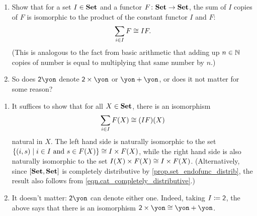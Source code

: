 \documentclass[Book-Poly]{subfiles}
\begin{document}
\begin{exercise} \label{exc.repeated_sum_is_product}
\begin{enumerate}
	\item Show that for a set $I \in \mathbf{Set}$ and a functor $F \colon \mathbf{Set} \to \mathbf{Set}$, the sum of $I$ copies of $F$ is isomorphic to the product of the constant functor $I$ and $F$:
    \[
        \sum_{i \in I}F\cong IF.
    \]
    (This is analogous to the fact from basic arithmetic that adding up $n \in \mathbb{N}$ copies of number is equal to multiplying that same number by $n$.)
	\item So does $\2\yon$ denote $\2\times\yon$ or $\yon+\yon$, or does it not matter for some reason?\qedhere
	\end{enumerate}
\begin{solution}
\begin{enumerate}
	\item It suffices to show that for all $X\in\mathbf{Set}$, there is an isomorphism
    \[
      \sum_{i\in I} F(X) \cong (IF)(X)
    \]
    natural in $X$.
    The left hand side is naturally isomorphic to the set $\{(i,s)\mid i\in I\text{ and }s\in F(X)\} \cong I \times F(X)$, while the right hand side is also naturally isomorphic to the set $I(X) \times F(X) \cong I \times F(X)$. (Alternatively, since $[\mathbf{Set},\mathbf{Set}]$ is completely distributive by \cref{prop.set_endofunc_distrib}, the result also follows from \eqref{eqn.cat_completely_distributive}.)
    \item It doesn't matter: $\2\yon$ can denote either one. Indeed, taking $I\coloneqq\textsf{2}$, the above says that there is an isomorphism $\2\times\yon\cong\yon+\yon$.
\end{enumerate}
\end{solution}
\end{exercise}
\end{document}
